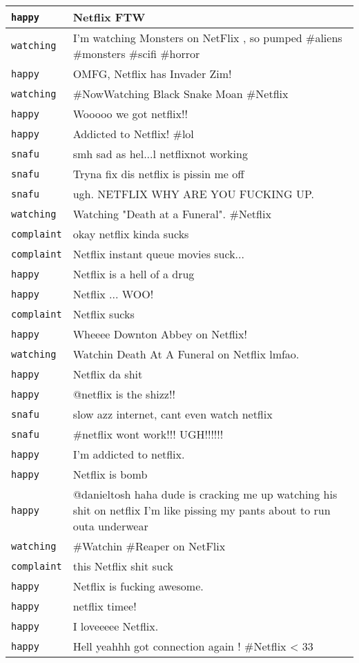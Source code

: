 {\begin{longtable}{|l|p{160mm}|}
      \tabularnewline\hline
         \texttt{happy} & Netflix FTW
      \tabularnewline\hline
         \texttt{watching} & I'm watching Monsters on NetFlix , so pumped \#aliens \#monsters \#scifi \#horror
      \tabularnewline\hline
         \texttt{happy} & OMFG, Netflix has Invader Zim!
      \tabularnewline\hline
         \texttt{watching} & \#NowWatching Black Snake Moan \#Netflix
      \tabularnewline\hline
         \texttt{happy} & Wooooo we got netflix!!
      \tabularnewline\hline
         \texttt{happy} & Addicted to Netflix! \#lol
      \tabularnewline\hline
         \texttt{snafu} & smh sad as hel...l netflixnot working
      \tabularnewline\hline
         \texttt{snafu} & Tryna fix dis netflix is pissin me off
      \tabularnewline\hline
         \texttt{snafu} & ugh. NETFLIX WHY ARE YOU FUCKING UP.
      \tabularnewline\hline
         \texttt{watching} & Watching "Death at a Funeral". \#Netflix
      \tabularnewline\hline
         \texttt{complaint} & okay netflix kinda sucks
      \tabularnewline\hline
         \texttt{complaint} & Netflix instant queue movies suck...
      \tabularnewline\hline
         \texttt{happy} & Netflix is a hell of a drug
      \tabularnewline\hline
         \texttt{happy} & Netflix ... WOO!
      \tabularnewline\hline
         \texttt{complaint} & Netflix sucks
      \tabularnewline\hline
         \texttt{happy} & Wheeee Downton Abbey on Netflix!
      \tabularnewline\hline
         \texttt{watching} & Watchin Death At A Funeral on Netflix lmfao.
      \tabularnewline\hline
         \texttt{happy} & Netflix da shit
      \tabularnewline\hline
         \texttt{happy} & @netflix is the shizz!!
      \tabularnewline\hline
         \texttt{snafu} & slow azz internet, cant even watch netflix
      \tabularnewline\hline
         \texttt{snafu} & \#netflix wont work!!! UGH!!!!!!
      \tabularnewline\hline
         \texttt{happy} & I'm addicted to netflix.
      \tabularnewline\hline
         \texttt{happy} & Netflix is bomb
      \tabularnewline\hline
         \texttt{happy} & @danieltosh haha dude is cracking me up watching his shit on netflix I'm like pissing my pants about to run outa underwear
      \tabularnewline\hline
         \texttt{watching} & \#Watchin \#Reaper on NetFlix
      \tabularnewline\hline
         \texttt{complaint} & this Netflix shit suck
      \tabularnewline\hline
         \texttt{happy} & Netflix is fucking awesome.
      \tabularnewline\hline
         \texttt{happy} & netflix timee!
      \tabularnewline\hline
         \texttt{happy} & I loveeeee Netflix.
      \tabularnewline\hline
         \texttt{happy} & Hell yeahhh got connection again ! \#Netflix < 33

\end{longtable}}
